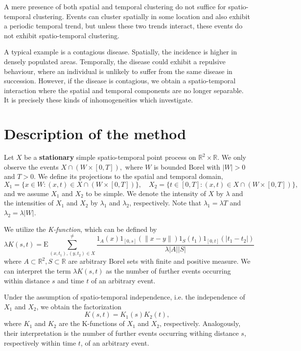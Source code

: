 \documentclass{article}
\begin{document}
A mere presence of both spatial and temporal clustering do not suffice for spatio-temporal clustering. Events can cluster spatially in some location and also exhibit a periodic temporal trend, but unless these two trends interact, these events do not exhibit spatio-temporal clustering. 

A typical example is a contagious disease. Spatially, the incidence is higher in densely populated areas. Temporally, the disease could exhibit a repulsive behaviour, where an individual is unlikely to suffer from the same disease in succession. However, if the disease is contagious, we obtain a spatio-temporal interaction where the spatial and temporal components are no longer separable. It is precisely these kinds of inhomogeneities which \cite{diggle1995} investigate.



\section{Description of the method}
 Let $X$ be a \textbf{stationary} simple spatio-temporal point process on $\mathbb R^2\times \mathbb R$. We only observe the events $X\cap(W\times [0,T]),$ where $W$ is bounded Borel with $|W|>0$ and $T>0$. We define its projections to the spatial and temporal domain,
$$X_1 = \{x \in W: (x,t)\in X\cap (W\times [0,T])\}, \quad X_2 = \{t \in [0,T]: (x,t) \in X\cap (W\times [0,T])\},$$
and we assume $X_1$ and $X_2$ to be simple. We denote the intensity of $X$ by $\lambda$ and the intensities of $X_1$ and $X_2$ by $\lambda_1$ and $\lambda_2$, respectively. Note that $\lambda_1 = \lambda T$ and $\lambda_2 = \lambda |W|$.


We utilize the \textit{K-function}, which can be defined by
$$\lambda K(s,t) = \mathrm{E} \sum^{\neq}_{(x,t_1),(y,t_2)\in X} \frac{1_A(x) 1_{[0,s]}(\|x-y\|) 1_S(t_1) 1_{[0,t]}(|t_1 - t_2|)}{\lambda |A| |S|}$$
where $A \subset \mathbb R^2, S \subset \mathbb R$ are arbitrary Borel sets with finite and positive measure. We can interpret the term $\lambda K(s,t)$ as the number of further events occurring within distance $s$ and time $t$ of an arbitrary event.

Under the assumption of spatio-temporal independence, i.e. the independence of $X_1$ and $X_2$, we obtain the factorization
\begin{equation}\label{eq:h0}K(s,t)=K_1(s)K_2(t),\end{equation}
where $K_1$ and $K_2$ are the K-functions of $X_1$ and $X_2$, respectively. Analogously, their interpretation is the number of further events occurring withing distance $s$, respectively within time $t$, of an arbitrary event.
\end{document}
